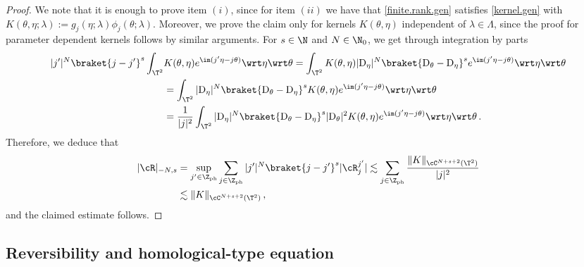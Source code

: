 \documentclass[a4paper,reqno,10pt]{article}
\begin{document}
\begin{proof}
	We note that it is enough to prove item $(i)$, since for item $(ii)$ we have that \eqref{finite.rank.gen} satisfies \eqref{kernel.gen} with $K(\theta,\eta;\lambda):= g_j(\eta;\lambda)\phi_{j}(\theta;\lambda)$. Moreover, we prove the claim only for kernels $K(\theta,\eta)$ independent of $\lambda\in\Lambda$, since the proof for parameter dependent kernels follows by similar arguments.
	For $s\in\N$ and $N\in\N_{0}$, we get through integration by parts 
	\begin{align}
		|j'|^{N} \braket{j-j'}^{s}\int_{\T^2} & K(\theta,\eta)e^{\im(j'\eta-j\theta)} \wrt\eta\wrt\theta  =  \int_{\T^2} K(\theta,\eta) |{\rm D}_\eta|^{N} \braket{{\rm D}_\theta-{\rm D}_\eta}^{s} e^{\im(j'\eta-j\theta)} \wrt\eta \wrt \theta \\
		& =  \int_{\T^2}  |{\rm D}_\eta|^{N} \braket{{\rm D}_\theta-{\rm D}_\eta}^{s} K(\theta,\eta)e^{\im(j'\eta-j\theta)} \wrt\eta\wrt\theta \\
		& = \frac{1}{|j|^2} \int_{\T^2}  |{\rm D}_\eta|^{N} \braket{{\rm D}_\theta-{\rm D}_\eta}^{s} | {\rm D}_\theta|^2  K(\theta,\eta)e^{\im(j'\eta-j\theta)} \wrt\eta\wrt\theta \,.
	\end{align}
	Therefore, we deduce that
	\begin{align}
		 |\cR|_{-N,s} & = \sup_{j'\in\Z_{\rm ph}}\sum_{j\in\Z_{\rm ph}}  |j'|^{N} \braket{j-j'}^{s}|\cR_{j}^{j'}| \lesssim {\sum_{j\in\Z_{\rm ph}} \frac{\| K \|_{\cC^{N+s+2}(\T^2)}}{|j|^2}} \\
         &\lesssim \| K \|_{\cC^{N+s+2}(\T^2)} \,,
	\end{align}
	and the claimed estimate follows.
\end{proof}


\subsection{Reversibility and homological-type equation}
\end{document}
